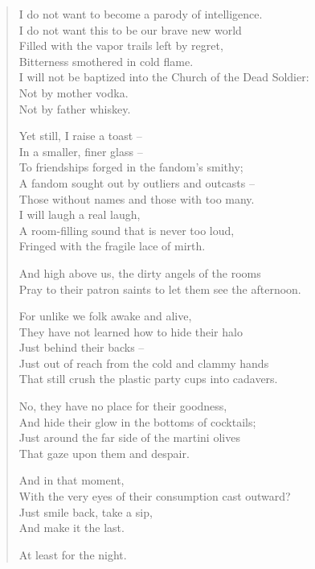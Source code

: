 \begin{verse}
  I do not want to become a parody of intelligence.\\
  I do not want this to be our brave new world\\
  Filled with the vapor trails left by regret,\\
  Bitterness smothered in cold flame.\\
  I will not be baptized into the Church of the Dead Soldier:\\
  Not by mother vodka.\\
  Not by father whiskey.\par

  Yet still, I raise a toast --\\
  In a smaller, finer glass --\\
  To friendships forged in the fandom's smithy;\\
  A fandom sought out by outliers and outcasts --\\
  Those without names and those with too many.\\
  I will laugh a real laugh,\\
  A room-filling sound that is never too loud,\\
  Fringed with the fragile lace of mirth.\par

  And high above us, the dirty angels of the rooms\\
  Pray to their patron saints to let them see the afternoon.\par

  For unlike we folk awake and alive,\\
  They have not learned how to hide their halo\\
  Just behind their backs --\\
  Just out of reach from the cold and clammy hands\\
  That still crush the plastic party cups into cadavers.\par

  No, they have no place for their goodness,\\
  And hide their glow in the bottoms of cocktails;\\
  Just around the far side of the martini olives\\
  That gaze upon them and despair.\par

  And in that moment,\\
  With the very eyes of their consumption cast outward?\\
  Just smile back, take a sip,\\
  And make it the last.\par

  At least for the night.
\end{verse}
